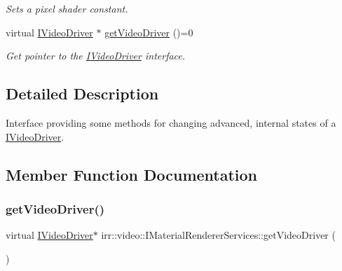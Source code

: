 \begin{DoxyCompactItemize}
\begin{DoxyCompactList}\small\item\em Sets a pixel shader constant. \end{DoxyCompactList}\item 
virtual \hyperlink{classirr_1_1video_1_1IVideoDriver}{I\+Video\+Driver} $\ast$ \hyperlink{classirr_1_1video_1_1IMaterialRendererServices_a2a80795887e43cb743eb5ee82604d4cf}{get\+Video\+Driver} ()=0
\begin{DoxyCompactList}\small\item\em Get pointer to the \hyperlink{classirr_1_1video_1_1IVideoDriver}{I\+Video\+Driver} interface. \end{DoxyCompactList}\end{DoxyCompactItemize}


\subsection{Detailed Description}
Interface providing some methods for changing advanced, internal states of a \hyperlink{classirr_1_1video_1_1IVideoDriver}{I\+Video\+Driver}. 

\subsection{Member Function Documentation}
\mbox{\label{classirr_1_1video_1_1IMaterialRendererServices_a2a80795887e43cb743eb5ee82604d4cf}} 
\subsubsection{\texorpdfstring{get\+Video\+Driver()}{getVideoDriver()}\hspace{0.1cm}{\footnotesize\ttfamily [1/2]}}
{\footnotesize\ttfamily virtual \hyperlink{classirr_1_1video_1_1IVideoDriver}{I\+Video\+Driver}$\ast$ irr\+::video\+::\+I\+Material\+Renderer\+Services\+::get\+Video\+Driver (\begin{DoxyParamCaption}{ }\end{DoxyParamCaption})\hspace{0.3cm}{\ttfamily [pure virtual]}}



